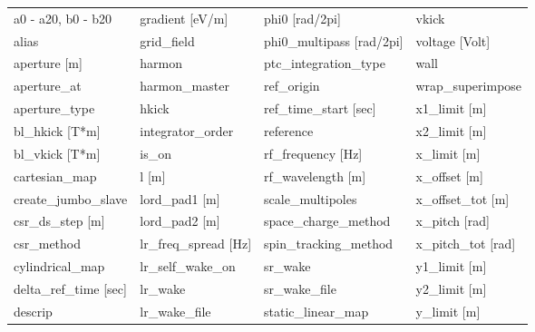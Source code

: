  \begin{tabular}{llll} \toprule
a0 - a20, b0 - b20               & gradient [eV/m]                  & phi0 [rad/2pi]                   & vkick                            \\
alias                            & grid_field                       & phi0_multipass [rad/2pi]         & voltage [Volt]                   \\
aperture [m]                     & harmon                           & ptc_integration_type             & wall                             \\
aperture_at                      & harmon_master                    & ref_origin                       & wrap_superimpose                 \\
aperture_type                    & hkick                            & ref_time_start [sec]             & x1_limit [m]                     \\
bl_hkick [T*m]                   & integrator_order                 & reference                        & x2_limit [m]                     \\
bl_vkick [T*m]                   & is_on                            & rf_frequency [Hz]                & x_limit [m]                      \\
cartesian_map                    & l [m]                            & rf_wavelength [m]                & x_offset [m]                     \\
create_jumbo_slave               & lord_pad1 [m]                    & scale_multipoles                 & x_offset_tot [m]                 \\
csr_ds_step [m]                  & lord_pad2 [m]                    & space_charge_method              & x_pitch [rad]                    \\
csr_method                       & lr_freq_spread [Hz]              & spin_tracking_method             & x_pitch_tot [rad]                \\
cylindrical_map                  & lr_self_wake_on                  & sr_wake                          & y1_limit [m]                     \\
delta_ref_time [sec]             & lr_wake                          & sr_wake_file                     & y2_limit [m]                     \\
descrip                          & lr_wake_file                     & static_linear_map                & y_limit [m]                      \\

\end{tabular}
